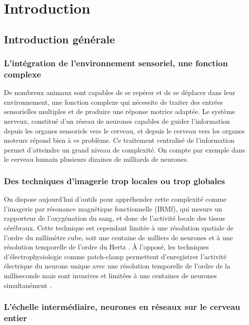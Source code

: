 \chapter{Introduction}\label{chapI}


\section{Introduction générale}

\subsection{L'intégration de l'environnement sensoriel, une fonction complexe}

De nombreux animaux sont capables de se repérer et de se déplacer dans leur environnement, une fonction complexe qui nécessite de traiter des entrées sensorielles multiples et de produire une réponse motrice adaptée. Le système nerveux, constitué d'un réseau de neurones capables de guider l'information depuis les organes sensoriels vers le cerveau, et depuis le cerveau vers les organes moteurs répond bien à ce problème. Ce traitement centralisé de l'information permet d'atteindre un grand niveau de complexité. On compte par exemple dans le cerveau humain plusieurs dizaines de milliards de neurones.

\subsection{Des techniques d'imagerie trop locales ou trop globales}

On dispose aujourd'hui d'outils pour appréhender cette complexité comme l'imagerie par résonance magnétique fonctionnelle (IRMf), qui mesure un rapporteur de l'oxygénation du sang, et donc de l'activité locale des tissus cérébraux. Cette technique est cependant limitée à une résolution spatiale de l'ordre du millimètre cube, soit une centaine de milliers de neurones et à une résolution temporelle de l'ordre du Hertz \cite{goense_fmri_2016}. À l'opposé, les techniques d'électrophysiologie comme patch-clamp permettent d'enregistrer l'activité électrique du neurone unique avec une résolution temporelle de l'ordre de la milliseconde mais sont invasives et limitées à une centaines de neurones simultanément \cite{berdondini_active_2009}.

\subsection{L'échelle intermédiaire, neurones en réseaux sur le cerveau entier}

